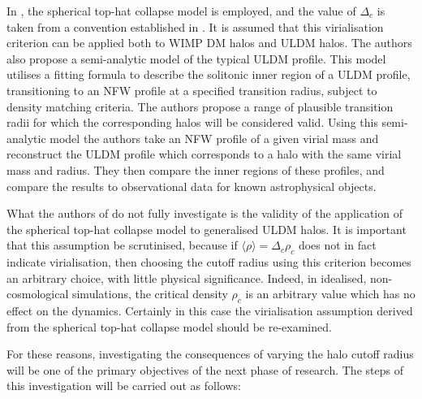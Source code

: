 In \cite{Robles:2018fur}, the spherical top-hat collapse model  is employed, and the value of $\Delta_c$ is taken from a convention established in \cite{Bryan:1997dn}. It is assumed that this virialisation criterion can be applied both to WIMP DM halos and ULDM halos. The authors also propose a semi-analytic model of the typical ULDM profile. This model utilises a fitting formula to describe the solitonic inner region of a ULDM profile, transitioning to an NFW profile at a specified transition radius, subject to density matching criteria. The authors propose a range of plausible transition radii for which the corresponding halos will be considered valid. Using this semi-analytic model the authors take an NFW profile of a given virial mass and reconstruct the ULDM profile which corresponds to a halo with the same virial mass and radius. They then compare the inner regions of these profiles, and compare the results to observational data for known astrophysical objects. 

What the authors of \cite{Robles:2018fur} do not fully investigate is the validity of the application of the spherical top-hat collapse model to generalised ULDM halos. It is important that this assumption be scrutinised, because if $\langle\rho\rangle=\Delta_c\rho_c$ does not in fact indicate virialisation, then choosing the cutoff radius using this criterion becomes an arbitrary choice, with little physical significance. Indeed, in idealised, non-cosmological simulations, the critical density $\rho_c$ is an arbitrary value which has no effect on the dynamics. Certainly in this case the virialisation assumption derived from the spherical top-hat collapse model should be re-examined.

For these reasons, investigating the consequences of varying the halo cutoff radius will be one of the primary objectives of the next phase of research. The steps of this investigation will be carried out as follows:

